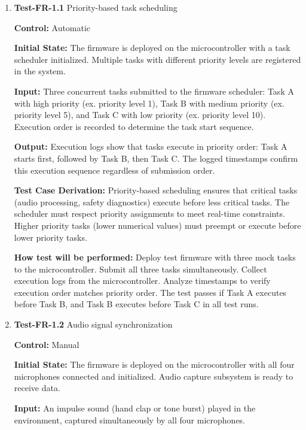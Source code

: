 \documentclass[12pt, titlepage]{article}
\begin{document}
\begin{enumerate}

\item{\textbf{Test-FR-1.1} Priority-based task scheduling \\}

\textbf{Control:} Automatic
					
\textbf{Initial State:} 
The firmware is deployed on the microcontroller with a task scheduler
initialized. Multiple tasks with different priority levels are registered in the
system.
					
\textbf{Input:}
Three concurrent tasks submitted to the firmware scheduler: Task A with high
priority (ex. priority level 1), Task B with medium priority (ex. priority level
 5), and Task C with low priority (ex. priority level 10). Execution order is 
 recorded to determine the task start sequence.
					
\textbf{Output:}
Execution logs show that tasks execute in priority order: Task A starts first,
followed by Task B, then Task C. The logged timestamps confirm this execution
sequence regardless of submission order.

\textbf{Test Case Derivation:} 
Priority-based scheduling ensures that critical tasks (audio processing, safety
diagnostics) execute before less critical tasks. The scheduler must respect
priority assignments to meet real-time constraints. Higher priority tasks (lower
numerical values) must preempt or execute before lower priority tasks.
					
\textbf{How test will be performed:}
Deploy test firmware with three mock tasks to the microcontroller. Submit all
three tasks simultaneously. Collect execution logs from the microcontroller.
Analyze timestamps to verify execution order matches priority order. The test
passes if Task A executes before Task B, and Task B executes before Task C in
all test runs.

\item{\textbf{Test-FR-1.2} Audio signal synchronization\\}

\textbf{Control:} Manual
					
\textbf{Initial State:} 
The firmware is deployed on the microcontroller with all four microphones
connected and initialized. Audio capture subsystem is ready to receive data.
					
\textbf{Input:}
An impulse sound (hand clap or tone burst) played in the environment, captured
simultaneously by all four microphones. 
					

\end{enumerate}
\end{document}
